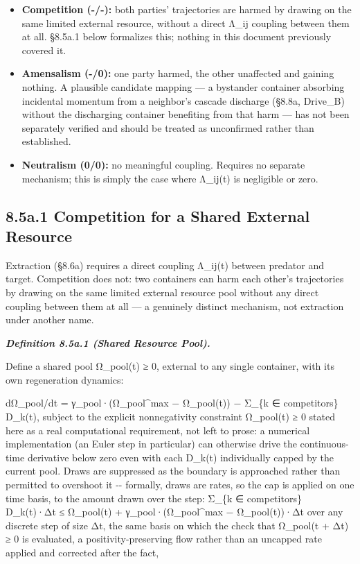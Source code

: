 \documentclass[
]{article}
\begin{document}
\begin{itemize}
\item
  \textbf{Competition (-/-):} both parties' trajectories are harmed by
  drawing on the same limited external resource, without a direct Λ\_ij
  coupling between them at all. §8.5a.1 below formalizes this; nothing
  in this document previously covered it.
\item
  \textbf{Amensalism (-/0):} one party harmed, the other unaffected and
  gaining nothing. A plausible candidate mapping --- a bystander
  container absorbing incidental momentum from a neighbor's cascade
  discharge (§8.8a, Drive\_B) without the discharging container
  benefiting from that harm --- has not been separately verified and
  should be treated as unconfirmed rather than established.
\item
  \textbf{Neutralism (0/0):} no meaningful coupling. Requires no
  separate mechanism; this is simply the case where Λ\_ij(t) is
  negligible or zero.
\end{itemize}

\hypertarget{a.1-competition-for-a-shared-external-resource}{%
\subsection{8.5a.1 Competition for a Shared External
Resource}\label{a.1-competition-for-a-shared-external-resource}}

Extraction (§8.6a) requires a direct coupling Λ\_ij(t) between predator
and target. Competition does not: two containers can harm each other's
trajectories by drawing on the same limited external resource pool
without any direct coupling between them at all --- a genuinely distinct
mechanism, not extraction under another name.

\emph{\textbf{Definition 8.5a.1 (Shared Resource Pool).}}

Define a shared pool Ω\_pool(t) ≥ 0, external to any single container,
with its own regeneration dynamics:

dΩ\_pool/dt = γ\_pool·(Ω\_pool\^{}max − Ω\_pool(t)) − Σ\_\{k ∈
competitors\} D\_k(t), subject to the explicit nonnegativity constraint
Ω\_pool(t) ≥ 0 stated here as a real computational requirement, not left
to prose: a numerical implementation (an Euler step in particular) can
otherwise drive the continuous-time derivative below zero even with each
D\_k(t) individually capped by the current pool. Draws are suppressed as
the boundary is approached rather than permitted to overshoot it -\/-
formally, draws are rates, so the cap is applied on one time basis, to
the amount drawn over the step: Σ\_\{k ∈ competitors\} D\_k(t)·Δt ≤
Ω\_pool(t) + γ\_pool·(Ω\_pool\^{}max − Ω\_pool(t))·Δt over any discrete
step of size Δt, the same basis on which the check that Ω\_pool(t + Δt)
≥ 0 is evaluated, a positivity-preserving flow rather than an uncapped
rate applied and corrected after the fact,
\end{document}

